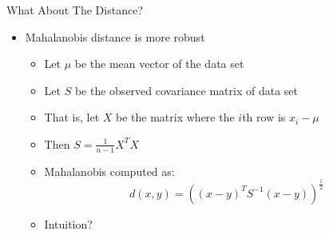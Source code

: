\documentclass[aspectratio=169]{beamer}
\begin{document}
\begin{frame}{What About The Distance?}

\begin{itemize}
\item Mahalanobis distance is more robust
	\begin{itemize}
	\item Let $\mu$ be the mean vector of the data set
	\item Let $S$ be the observed covariance matrix of data set
	\item That is, let $X$ be the matrix where the $i$th row is $x_i - \mu$
	\item Then $S = \frac{1}{n - 1} X^T X$ 	
	\item Mahalanobis computed as:
		$$ d(x, y) = \left((x - y)^T S^{-1} (x - y)\right)^{\frac{1}{2}}$$
	\item Intuition?
	\end{itemize}
\end{itemize}
\end{frame}
%
\end{document}
